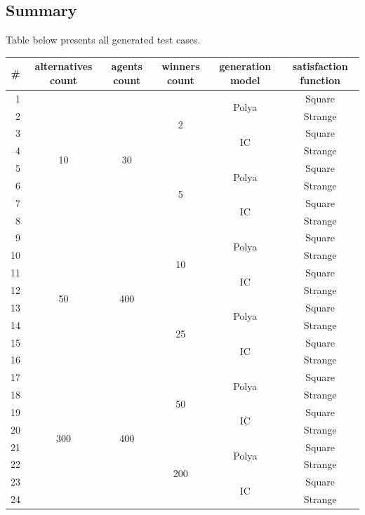 \subsection{Summary}

Table below presents all generated test cases.

\begin{tabular}{r | c | c | c | c | c |}
	\# & alternatives count & agents count & winners count & generation model & satisfaction function \\
	\hline
	1 & \multirow{8}{*}{10} & \multirow{8}{*}{30} & \multirow{4}{*}{2} & \multirow{2}{*}{Polya} & Square \\
	2 & & & & & Strange \\
	\cline{5-6}
	3 & & & & \multirow{2}{*}{IC} & Square \\
	4 & & & & & Strange \\
	\cline{4-6}
	5 & & & \multirow{4}{*}{5} & \multirow{2}{*}{Polya} & Square \\
	6 & & & & & Strange \\
	\cline{5-6}
	7 & & & & \multirow{2}{*}{IC} & Square \\
	8 & & & & & Strange \\
	\hline
	9 & \multirow{8}{*}{50} & \multirow{8}{*}{400} & \multirow{4}{*}{10} & \multirow{2}{*}{Polya} & Square \\
	10 & & & & & Strange \\
	\cline{5-6}
	11 & & & & \multirow{2}{*}{IC} & Square \\
	12 & & & & & Strange \\
	\cline{4-6}
	13 & & & \multirow{4}{*}{25} & \multirow{2}{*}{Polya} & Square \\
	14 & & & & & Strange \\
	\cline{5-6}
	15 & & & & \multirow{2}{*}{IC} & Square \\
	16 & & & & & Strange \\
	\hline
	17 & \multirow{8}{*}{300} & \multirow{8}{*}{400} & \multirow{4}{*}{50} & \multirow{2}{*}{Polya} & Square \\
	18 & & & & & Strange \\
	\cline{5-6}
	19 & & & & \multirow{2}{*}{IC} & Square \\
	20 & & & & & Strange \\
	\cline{4-6}
	21 & & & \multirow{4}{*}{200} & \multirow{2}{*}{Polya} & Square \\
	22 & & & & & Strange \\
	\cline{5-6}
	23 & & & & \multirow{2}{*}{IC} & Square \\
	24 & & & & & Strange \\
	\hline
\end{tabular}
\\

